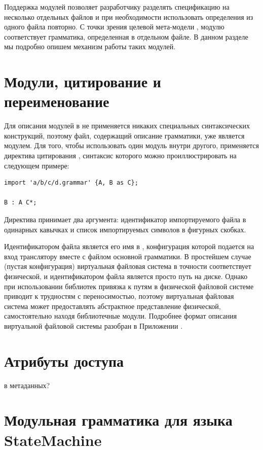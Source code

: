 Поддержка модулей позволяет разработчику разделять спецификацию на несколько отдельных файлов и при необходимости использовать определения из одного файла повторно.  С точки зрения целевой мета-модели , модулю соответствует грамматика, определенная в отдельном файле. В данном разделе мы подробно опишем механизм работы таких модулей.

\section{Модули, цитирование и переименование}

Для описания модулей в  не применяется никаких специальных синтаксических конструкций, поэтому файл, содержащий описание грамматики, уже является модулем. Для того, чтобы использовать один модуль внутри другого, применяется директива цитирования , синтаксис которого можно проиллюстрировать на следующем примере:
\begin{lstlisting}
import 'a/b/c/d.grammar' {A, B as C};

B : A C*;
\end{lstlisting}  
Директива  принимает два аргумента: идентификатор импортируемого файла в одинарных кавычках и список импортируемых символов в фигурных скобках. 

Идентификатором файла является его имя в , конфигурация которой подается на вход транслятору  вместе с файлом основной грамматики. В простейшем случае (пустая конфигурация) виртуальная файловая система в точности соответствует физической, и идентификатором файла является просто путь на диске. Однако при использовании библиотек привязка к путям в физической файловой системе приводит к трудностям с переносимостью, поэтому виртуальная файловая система может предоставлять абстрактное представление физической, самостоятельно находя библиотечные модули. Подробнее формат описания виртуальной файловой системы разобран в Приложении .



\section{Атрибуты доступа}

в метаданных?
\section{Модульная грамматика для языка StateMachine}

